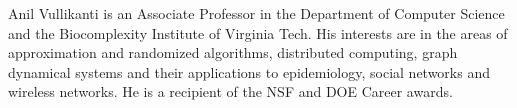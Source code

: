 \vspace{-1.8cm}

\begin{IEEEbiography}{Anil Vullikanti}
 is an Associate Professor in the Department of Computer Science and the 
  Biocomplexity Institute of Virginia
 Tech. His interests are in the areas of approximation and randomized algorithms, 
distributed computing, graph dynamical systems and their applications to
epidemiology, social networks and wireless networks.  He is a
 recipient of the NSF and DOE Career awards.  \end{IEEEbiography}











